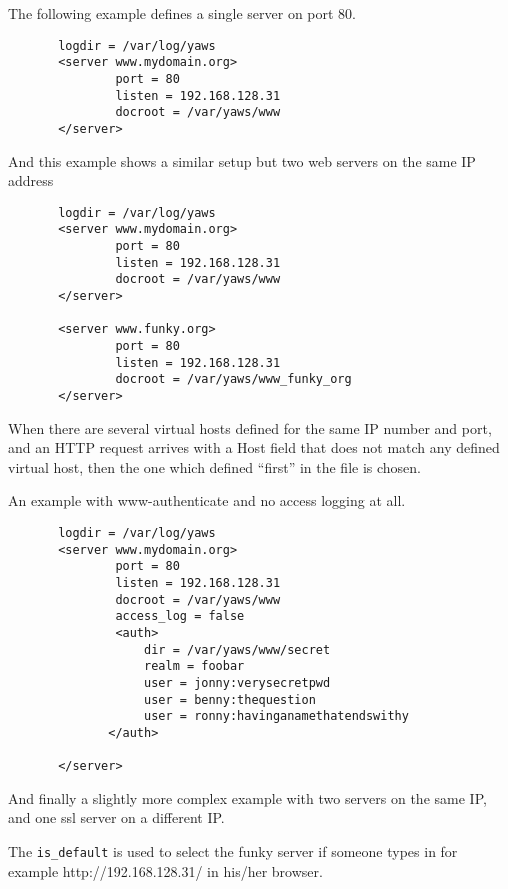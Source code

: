 \documentclass[11pt,oneside,english]{book}
\begin{document}
       The  following  example  defines a single server on
       port 80.

\begin{verbatim}
       logdir = /var/log/yaws
       <server www.mydomain.org>
               port = 80
               listen = 192.168.128.31
               docroot = /var/yaws/www
       </server>

\end{verbatim}
       And this example shows a similar setup but two web­
       servers on the same IP address

\begin{verbatim}
       logdir = /var/log/yaws
       <server www.mydomain.org>
               port = 80
               listen = 192.168.128.31
               docroot = /var/yaws/www
       </server>

       <server www.funky.org>
               port = 80
               listen = 192.168.128.31
               docroot = /var/yaws/www_funky_org
       </server>

\end{verbatim}



When there are several
virtual hosts defined for the same IP number and port,
and an HTTP request arrives with a Host field that does
not match any defined virtual host, then the one which
defined ``first'' in the file is chosen.


An example with www-authenticate and no access logging at all.

\begin{verbatim}
       logdir = /var/log/yaws
       <server www.mydomain.org>
               port = 80
               listen = 192.168.128.31
               docroot = /var/yaws/www
               access_log = false
               <auth>
                   dir = /var/yaws/www/secret
                   realm = foobar
                   user = jonny:verysecretpwd
                   user = benny:thequestion
                   user = ronny:havinganamethatendswithy
              </auth>

       </server>
\end{verbatim}

       And  finally  a  slightly more complex example with
       two servers on the same IP, and one ssl server on a
       different IP.

       The \verb+is_default+ is used to select the funky server if
       someone types in for example http://192.168.128.31/ in his/her
       browser.
\end{document}
